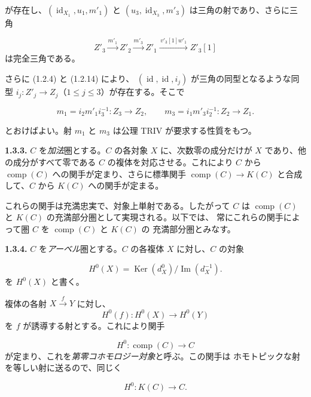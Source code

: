 
\clearpage
{}%
\begingroup
\small
\setlength{\emergencystretch}{1.5em}%
\setlength{\abovedisplayskip}{4pt plus 2pt minus 2pt}%
\setlength{\belowdisplayskip}{4pt plus 2pt minus 2pt}%

\noindent が存在し、$(\operatorname{id}_{X_1},u_1,m'_1)$ と
$(u_3,\operatorname{id}_{X_3},m'_3)$ は三角の射であり、さらに三角

\[
  Z'_3\xrightarrow{m'_1}Z'_2\xrightarrow{m'_3}Z'_1
  \xrightarrow{\,v'_3[1]w'_1\,}Z'_3[1]
\]
\noindent は完全三角である。

さらに (1.2.4) と (1.2.14) により、
$(\operatorname{id},\operatorname{id},i_j)$ が三角の同型となるような同型
$i_j\colon Z'_j\longrightarrow Z_j$（$1\leq j\leq 3$）が存在する。そこで

\[
  m_1=i_2m'_1i_3^{-1}\colon Z_3\longrightarrow Z_2,
  \qquad
  m_3=i_1m'_3i_2^{-1}\colon Z_2\longrightarrow Z_1.
\]

とおけばよい。射 $m_1$ と $m_3$ は公理 TRIV が要求する性質をもつ。

\medskip
\noindent\textbf{1.3.3.}\quad
$C$ を\emph{加法}圏とする。$C$ の各対象 $X$ に、次数零の成分だけが $X$
であり、他の成分がすべて零である $C$ の複体を対応させる。これにより $C$
から $\operatorname{comp}(C)$ への関手が定まり、さらに標準関手
$\operatorname{comp}(C)\longrightarrow K(C)$ と合成して、$C$ から $K(C)$
への関手が定まる。

これらの関手は充満忠実で、対象上単射である。したがって $C$ は
$\operatorname{comp}(C)$ と $K(C)$ の充満部分圏として実現される。以下では、
常にこれらの関手によって圏 $C$ を $\operatorname{comp}(C)$ と $K(C)$ の
充満部分圏とみなす。

\medskip
\noindent\textbf{1.3.4.}\quad
$C$ を\emph{アーベル}圏とする。$C$ の各複体 $X$ に対し、$C$ の対象

\[
  H^0(X)=\operatorname{Ker}(d_X^0)/\operatorname{Im}(d_X^{-1}).
  \tag{1.3.4.1}
\]
\noindent を $H^0(X)$ と書く。

複体の各射 $X\xrightarrow{f}Y$ に対し、
\[
  H^0(f)\colon H^0(X)\longrightarrow H^0(Y)
\]
\noindent を $f$ が誘導する射とする。これにより関手

\[
  H^0\colon\operatorname{comp}(C)\longrightarrow C
\]
\noindent が定まり、これを\emph{第零コホモロジー対象}と呼ぶ。この関手は
ホモトピックな射を等しい射に送るので、同じく

\[
  H^0\colon K(C)\longrightarrow C.
\]
\endgroup
